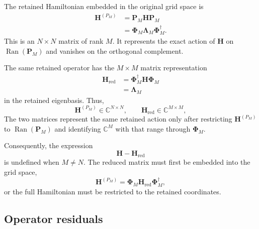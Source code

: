 The retained Hamiltonian embedded in the original grid space is
\begin{align}
    \mathbf H^{(P_M)}
    &=
    \mathbf P_M\mathbf H\mathbf P_M
    \\
    &=
    \boldsymbol\Phi_M
    \boldsymbol\Lambda_M
    \boldsymbol\Phi_M^\dagger.
\end{align}
This is an $N\times N$ matrix of rank $M$. It represents the exact action of
$\mathbf H$ on $\operatorname{Ran}(\mathbf P_M)$ and vanishes on the
orthogonal complement.

The same retained operator has the $M\times M$ matrix representation
\begin{align}
    \mathbf H_{\mathrm{red}}
    &=
    \boldsymbol\Phi_M^\dagger
    \mathbf H
    \boldsymbol\Phi_M
    \\
    &=
    \boldsymbol\Lambda_M
\end{align}
in the retained eigenbasis. Thus,
\begin{equation}
    \mathbf H^{(P_M)}\in\mathbb C^{N\times N},
    \qquad
    \mathbf H_{\mathrm{red}}\in\mathbb C^{M\times M},
\end{equation}
The two matrices represent the same retained action only after restricting
$\mathbf H^{(P_M)}$ to $\operatorname{Ran}(\mathbf P_M)$ and identifying
$\mathbb C^M$ with that range through $\boldsymbol\Phi_M$.

Consequently, the expression
\begin{equation}
    \mathbf H-\mathbf H_{\mathrm{red}}
\end{equation}
is undefined when $M\neq N$. The reduced matrix must first be embedded into
the grid space,
\begin{equation}
    \mathbf H^{(P_M)}
    =
    \boldsymbol\Phi_M
    \mathbf H_{\mathrm{red}}
    \boldsymbol\Phi_M^\dagger,
\end{equation}
or the full Hamiltonian must be restricted to the retained coordinates.

\subsection{Operator residuals}


